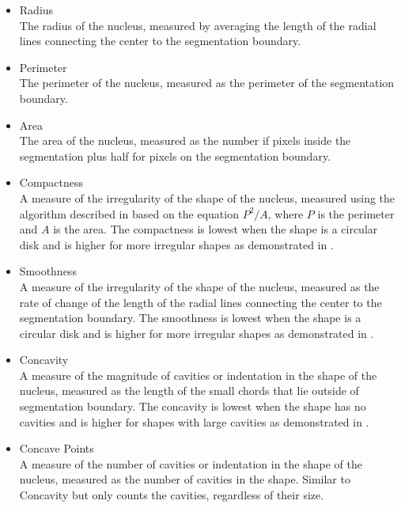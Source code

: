 \documentclass[twocolumn]{article}
\begin{document}
\begin{itemize}
  \item Radius\\
  The radius of the nucleus, measured by averaging the length of the radial
  lines connecting the center to the segmentation boundary.

  \item Perimeter\\
  The perimeter of the nucleus, measured as the perimeter of the segmentation
  boundary.

  \item Area\\
  The area of the nucleus, measured as the number if pixels inside the
  segmentation plus half for pixels on the segmentation boundary.

  \item Compactness\\
  A measure of the irregularity of the shape of the nucleus, measured using the
  algorithm described in \autocite{Ballard1982} based on the equation
  $P^2 / A$, where $P$ is the perimeter and $A$ is the area. The compactness is
  lowest when the shape is a circular disk and is higher for more irregular
  shapes as demonstrated in .

  \item Smoothness\\
  A measure of the irregularity of the shape of the nucleus, measured as the
  rate of change of the length of the radial lines connecting the center to the
  segmentation boundary. The smoothness is lowest when the shape is a circular
  disk and is higher for more irregular shapes as demonstrated in
  .

  \item Concavity\\
  A measure of the magnitude of cavities or indentation in the shape of the
  nucleus, measured as the length of the small chords that lie outside of
  segmentation boundary. The concavity is lowest when the shape has no cavities
  and is higher for shapes with large cavities as demonstrated in
  .

  \item Concave Points\\
  A measure of the number of cavities or indentation in the shape of the
  nucleus, measured as the number of cavities in the shape. Similar to
  Concavity but only counts the cavities, regardless of their size.


\end{itemize}
\end{document}
